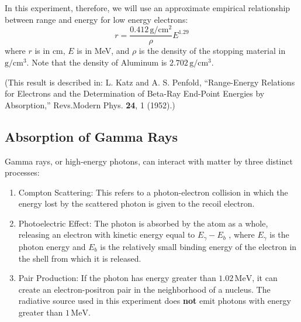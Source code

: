 In this experiment, therefore, we will use an approximate empirical relationship between range and energy for low energy electrons:
\begin{equation}
  r=\frac{0.412\, \mathrm{g}/\mathrm{cm}^2}{\rho}E^{1.29}
\label{eq:re}
\end{equation}
where $r$ is in cm, $E$ is in MeV, and $\rho$ is the density of the stopping material in $\mathrm{g} / \mathrm{cm}^3$. Note that the density of Aluminum is $2.702\,\mathrm{g} /\mathrm{cm}^{3}$.\myskip

(This result is described in: L. Katz and A. S. Penfold, ``Range-Energy Relations for Electrons and the Determination of Beta-Ray End-Point Energies by Absorption,'' Revs.Modern Phys. \textbf{24}, 1 (1952).)

\subsection{Absorption of Gamma Rays}
Gamma rays, or high-energy photons, can interact with matter by three distinct processes:
\begin{enumerate}[1)]
\item Compton Scattering: This refers to a photon-electron collision in which the energy lost by the scattered photon is given to the recoil electron.
\item Photoelectric Effect: The photon is absorbed by the atom as a whole, releasing an electron with kinetic energy equal to $E_{\gamma} - E_{b}$ , where $E_{\gamma}$ is the photon energy and $E_{b}$ is the relatively small binding energy of the electron in the shell from which it is released.
\item Pair Production: If the photon has energy greater than $1.02\, \mathrm{MeV}$, it can create an electron-positron pair in the neighborhood of a nucleus. The radiative source used in this experiment does \textbf{not} emit photons with energy greater than $1\, \mathrm{MeV}$.
\end{enumerate}

